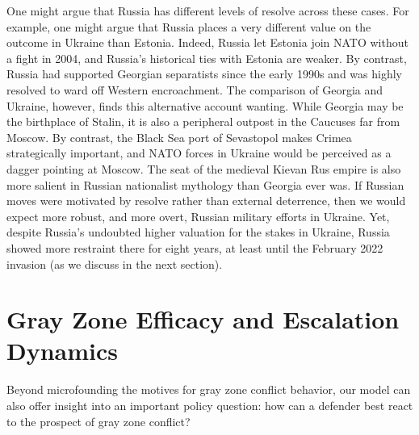 \documentclass[11pt,letterpaper,pdftex,dvipsnames,table]{article}
\begin{document}
One might argue that Russia has different levels of resolve across these cases. For example, one might argue that Russia places a very different value on the outcome in Ukraine than Estonia. Indeed, Russia let Estonia join NATO without a fight in 2004, and Russia's historical ties with Estonia are weaker. By contrast, Russia had supported Georgian separatists since the early 1990s and was highly resolved to ward off Western encroachment. The comparison of Georgia and Ukraine, however, finds this alternative account wanting. While Georgia may be the birthplace of Stalin, it is also a peripheral outpost in the Caucuses far from Moscow. By contrast, the Black Sea port of Sevastopol makes Crimea strategically important, and NATO forces in Ukraine would be perceived as a dagger pointing at Moscow. The seat of the medieval Kievan Rus empire is also more salient in Russian nationalist mythology than Georgia ever was. If Russian moves were motivated by resolve rather than external deterrence, then we would expect more robust, and more overt, Russian military efforts in Ukraine. Yet, despite Russia’s undoubted higher valuation for the stakes in Ukraine, Russia showed more restraint there for eight years, at least until the February 2022 invasion (as we discuss in the next section).

\section{Gray Zone Efficacy and Escalation Dynamics}\label{counterintuitivefinding}

\label{gzdefense} Beyond microfounding the motives for gray zone conflict behavior, our model can also offer insight into an important policy question: how can a defender best react to the prospect of gray zone conflict? 
\end{document}
